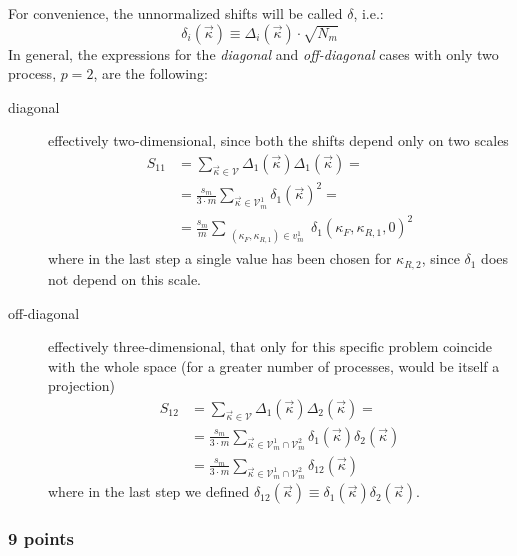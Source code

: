 For convenience, the unnormalized shifts will be called $\delta$, i.e.:
\begin{equation}
    \delta_i(\vec{\kappa}) \equiv \Delta_i(\vec{\kappa}) \cdot \sqrt{N_m}
\end{equation}
In general, the expressions for the \textit{diagonal} and \textit{off-diagonal}
cases with only two process, $p = 2$, are the following:
\begin{description}
    \item[diagonal] effectively two-dimensional, since both the shifts depend only on two scales
        \begin{align}
            S_{11} &= \sum_{\vec{\kappa} \in \mathcal{V}} \Delta_1(\vec{\kappa}) \Delta_1(\vec{\kappa}) =\\
                   &= \frac{s_m}{3 \cdot m} \sum_{\vec{\kappa} \in \mathcal{V}_m^1} \delta_1(\vec{\kappa})^2 =\\
                   &= \frac{s_m}{m} \sum_{\substack{(\kappa_F, \kappa_{R,1}) \in v_m^1 }} \delta_1(\kappa_F, \kappa_{R, 1}, 0)^2
            \label{eq:main-explicit-diag}
        \end{align}
        where in the last step a single value has been chosen for $\kappa_{R,
        2}$, since $\delta_1$ does not depend on this scale.
    \item[off-diagonal] effectively three-dimensional, that only for this
        specific problem coincide with the whole space (for a greater number of
        processes, would be itself a projection)
        \begin{align}
            S_{12} &= \sum_{\vec{\kappa} \in \mathcal{V}} \Delta_1(\vec{\kappa}) \Delta_2(\vec{\kappa}) =\\
                   &= \frac{s_m}{3 \cdot m} \sum_{\vec{\kappa} \in \mathcal{V}_m^1\cap\mathcal{V}_m^2} \delta_1(\vec{\kappa}) \delta_2(\vec{\kappa})\\
                   &= \frac{s_m}{3 \cdot m} \sum_{\vec{\kappa} \in \mathcal{V}_m^1\cap\mathcal{V}_m^2} \delta_{12}(\vec{\kappa})
            \label{eq:main-off-diag}
        \end{align}
        where in the last step we defined $\delta_{12}(\vec{\kappa}) \equiv \delta_1(\vec{\kappa})\delta_2(\vec{\kappa})$.
\end{description}

\subsubsection{9 points}

